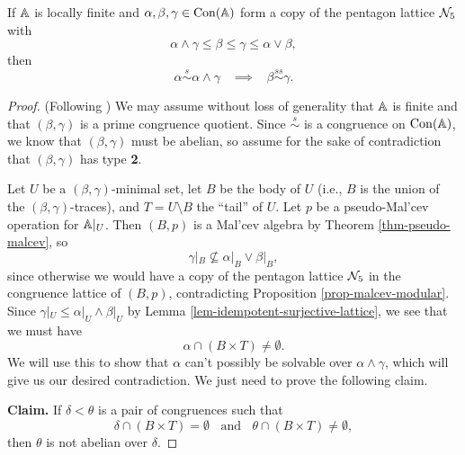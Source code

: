 \begin{appendices}
\begin{thm} If $\mathbb{A}$ is locally finite and $\alpha, \beta, \gamma \in \operatorname{Con}(\mathbb{A})$ form a copy of the pentagon lattice $\mathcal{N}_5$ with
\[
\alpha \wedge \gamma \le \beta \le \gamma \le \alpha \vee \beta,
\]
then
\[
\alpha \stackrel{s}{\sim} \alpha \wedge \gamma \;\;\; \implies \;\;\; \beta \stackrel{ss}{\sim} \gamma.
\]
\end{thm}
\begin{proof} (Following \cite{hobby-mckenzie}) We may assume without loss of generality that $\mathbb{A}$ is finite and that $(\beta, \gamma)$ is a prime congruence quotient. Since $\stackrel{s}{\sim}$ is a congruence on $\operatorname{Con}(\mathbb{A})$, we know that $(\beta,\gamma)$ must be abelian, so assume for the sake of contradiction that $(\beta, \gamma)$ has type \textbf{2}.

Let $U$ be a $(\beta, \gamma)$-minimal set, let $B$ be the body of $U$ (i.e., $B$ is the union of the $(\beta,\gamma)$-traces), and $T = U \setminus B$ the ``tail'' of $U$. Let $p$ be a pseudo-Mal'cev operation for $\mathbb{A}|_U$. Then $(B, p)$ is a Mal'cev algebra by Theorem \ref{thm-pseudo-malcev}, so
\[
\gamma|_B \not\subseteq \alpha|_B \vee \beta|_B,
\]
since otherwise we would have a copy of the pentagon lattice $\mathcal{N}_5$ in the congruence lattice of $(B, p)$, contradicting Proposition \ref{prop-malcev-modular}. Since $\gamma|_U \le \alpha|_U \wedge \beta|_U$ by Lemma \ref{lem-idempotent-surjective-lattice}, we see that we must have
\[
\alpha \cap (B\times T) \ne \emptyset.
\]
We will use this to show that $\alpha$ can't possibly be solvable over $\alpha \wedge \gamma$, which will give us our desired contradiction. We just need to prove the following claim.

{\bf Claim.} If $\delta < \theta$ is a pair of congruences such that
\[
\delta \cap (B \times T) = \emptyset \;\; \text{ and } \;\; \theta \cap (B \times T) \ne \emptyset,
\]
then $\theta$ is not abelian over $\delta$.


\end{proof}
\end{appendices}

